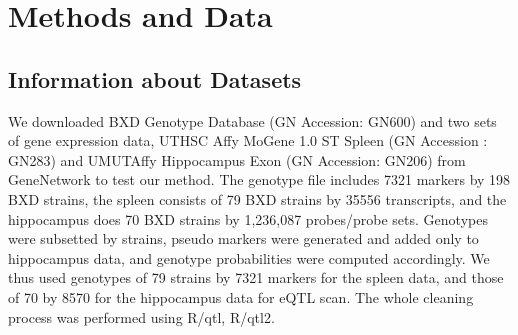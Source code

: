 \documentclass[9pt,twocolumn,twoside,lineno]{gsag3jnl}
\begin{document}
\section{Methods and Data}
\label{sec:methods:Data}



\subsection{Information about Datasets}

We downloaded BXD Genotype Database (GN Accession: GN600) and two sets of gene expression data, 
UTHSC Affy MoGene 1.0 ST Spleen (GN Accession : GN283)
and  UMUTAffy Hippocampus Exon (GN Accession: GN206) from GeneNetwork to test our method.  
The genotype file includes 7321 markers by 198 BXD strains, the spleen consists of 79 BXD strains by 35556 transcripts, 
and the hippocampus does 70 BXD strains by 1,236,087 probes/probe sets.  
Genotypes were subsetted by strains, pseudo markers were generated and added only to hippocampus data, 
and genotype probabilities were computed accordingly.  We thus used genotypes of 79 strains by 7321 markers for the spleen data, and 
those of 70 by 8570 for the hippocampus data for eQTL scan.  The whole cleaning process was performed using R/qtl, R/qtl2.
\end{document}
